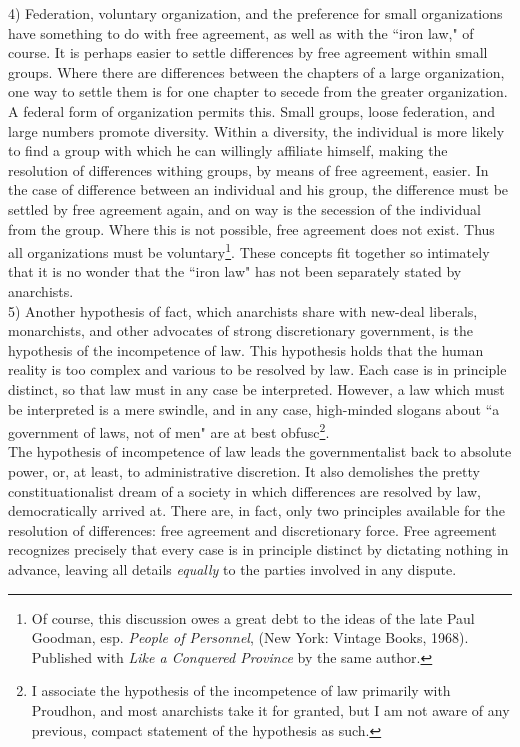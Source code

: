 \documentclass[12pt, onecolumn, letterpaper, oneside]{book}
\begin{document}
4) Federation, voluntary organization, and the preference for small organizations have something to do with free agreement, as well as with the ``iron law," of course. It is perhaps easier to settle differences by free agreement within small groups. Where there are differences between the chapters of a large organization, one way to settle them is for one chapter to secede from the greater organization. A federal form of organization permits this. Small groups, loose federation, and large numbers promote diversity. Within a diversity, the individual is more likely to find a group with which he can willingly affiliate himself, making the resolution of differences withing groups, by means of free agreement, easier. In the case of difference between an individual and his group, the difference must be settled by free agreement again, and on way is the secession of the individual from the group. Where this is not possible, free agreement does not exist. Thus all organizations must be voluntary\footnote{Of course, this discussion owes a great debt to the ideas of the late Paul Goodman, esp. \emph{People of Personnel}, (New York: Vintage Books, 1968). Published with \emph{Like a Conquered Province} by the same author.}. These concepts fit together so intimately that it is no wonder that the ``iron law" has not been separately stated by anarchists.\\

5) Another hypothesis of fact, which anarchists share with new-deal liberals, monarchists, and other advocates of strong discretionary government, is the hypothesis of the incompetence of law. This hypothesis holds that the human reality is too complex and various to be resolved by law. Each case is in principle distinct, so that law must in any case be interpreted. However, a law which must be interpreted is a mere swindle, and in any case, high-minded slogans about ``a government of laws, not of men" are at best obfusc\footnote{I associate the hypothesis of the incompetence of law primarily with Proudhon, and most anarchists take it for granted, but I am not aware of any previous, compact statement of the hypothesis as such.}.\\
The hypothesis of incompetence of law leads the governmentalist back to absolute power, or, at least, to administrative discretion. It also demolishes the pretty constituationalist dream of a society in which differences are resolved by law, democratically arrived at. There are, in fact, only two principles available for the resolution of differences: free agreement and discretionary force. Free agreement recognizes precisely that every case is in principle distinct by dictating nothing in advance, leaving all details \emph{equally} to the parties involved in any dispute.\\
\end{document}
